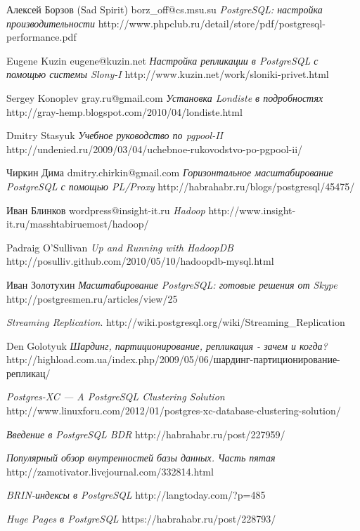 \renewcommand\bibname{Литература}

\begin{thebibliography}{9}

  Алексей Борзов (Sad Spirit) borz\_off@cs.msu.su
  \emph{PostgreSQL: настройка производительности}
  http://www.phpclub.ru/detail/store/pdf/postgresql-performance.pdf

  Eugene Kuzin eugene@kuzin.net
  \emph{Настройка репликации в PostgreSQL с помощью системы Slony-I}
  http://www.kuzin.net/work/sloniki-privet.html

  Sergey Konoplev gray.ru@gmail.com
  \emph{Установка Londiste в подробностях}
  http://gray-hemp.blogspot.com/2010/04/londiste.html

  Dmitry Stasyuk
  \emph{Учебное руководство по pgpool-II}
  http://undenied.ru/2009/03/04/uchebnoe-rukovodstvo-po-pgpool-ii/

  Чиркин Дима dmitry.chirkin@gmail.com
  \emph{Горизонтальное масштабирование PostgreSQL с помощью PL/Proxy}
  http://habrahabr.ru/blogs/postgresql/45475/

  Иван Блинков wordpress@insight-it.ru
  \emph{Hadoop}
  http://www.insight-it.ru/masshtabiruemost/hadoop/

  Padraig O'Sullivan
  \emph{Up and Running with HadoopDB}
  http://posulliv.github.com/2010/05/10/hadoopdb-mysql.html

  Иван Золотухин
  \emph{Масштабирование PostgreSQL: готовые решения от Skype}
  http://postgresmen.ru/articles/view/25

  \emph{Streaming Replication}.
  http://wiki.postgresql.org/wiki/Streaming\_Replication

  Den Golotyuk
  \emph{Шардинг, партиционирование, репликация - зачем и когда?}
  http://highload.com.ua/index.php/2009/05/06/шардинг-партиционирование-репликац/

  \emph{Postgres-XC — A PostgreSQL Clustering Solution}
  http://www.linuxforu.com/2012/01/postgres-xc-database-clustering-solution/

  \emph{Введение в PostgreSQL BDR}
  http://habrahabr.ru/post/227959/

  \emph{Популярный обзор внутренностей базы данных. Часть пятая}
  http://zamotivator.livejournal.com/332814.html

  \emph{BRIN-индексы в PostgreSQL}
  http://langtoday.com/?p=485

  \emph{Huge Pages в PostgreSQL}
  https://habrahabr.ru/post/228793/


\end{thebibliography}